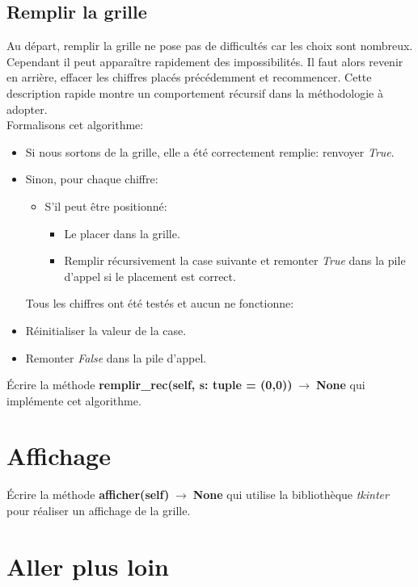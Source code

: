 \documentclass[a4paper,11pt]{article}
\begin{document}
\begin{Form}
\subsection{Remplir la grille}
Au départ, remplir la grille ne pose pas de difficultés car les choix sont nombreux. Cependant il peut apparaître rapidement des impossibilités. Il faut alors revenir en arrière, effacer les chiffres placés précédemment et recommencer. Cette description rapide montre un comportement récursif dans la méthodologie à adopter.\\
Formalisons cet algorithme:
\begin{itemize}
\item Si nous sortons de la grille, elle a été correctement remplie: renvoyer \emph{True}.
\item Sinon, pour chaque chiffre:
\begin{itemize}
\item S'il peut être positionné:
\begin{itemize}
\item Le placer dans la grille.
\item Remplir récursivement la case suivante et remonter \emph{True} dans la pile d'appel si le placement est correct.
\end{itemize}
\end{itemize}
Tous les chiffres ont été testés et aucun ne fonctionne: 
\item Réinitialiser la valeur de la case.
\item Remonter \emph{False} dans la pile d'appel.
\end{itemize}
\begin{activite}
Écrire la méthode \textbf{remplir\_rec(self, s: tuple = (0,0))$\;\rightarrow\;$None} qui implémente cet algorithme.
\end{activite}
\section{Affichage}
\begin{activite}
Écrire la méthode \textbf{afficher(self)$\;\rightarrow\;$None} qui utilise la bibliothèque \emph{tkinter} pour réaliser un affichage de la grille.
\end{activite}
\section{Aller plus loin}

\end{Form}
\end{document}
